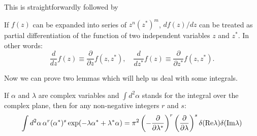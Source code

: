 This is straightforwardly followed by
\begin{lemma}
\label{lmm:formalism:c-numbers:independent-vars}
If $f(z)$ can be expanded into series of $z^n (z^*)^m$, $df(z)/dz$ can be treated as partial differentiation of the function of two independent variables $z$ and $z^*$.
In other words:
\[
	\frac{d}{dz} f(z) \equiv \frac{\partial}{\partial z} f(z, z^*),
	\quad
	\frac{d}{dz^*} f(z) \equiv \frac{\partial}{\partial z^*} f(z, z^*).
\]
\end{lemma}

Now we can prove two lemmas which will help us deal with some integrals.

\begin{lemma}
\label{lmm:formalism:c-numbers:fourier-of-moments}
If $\alpha$ and $\lambda$ are complex variables and $\int d^2\alpha$ stands for the integral over the complex plane, then for any non-negative integers $r$ and $s$:
\[
	\int d^2\alpha\, \alpha^r (\alpha^*)^s \exp(-\lambda \alpha^* + \lambda^* \alpha)
	= \pi^2
		\left( -\frac{\partial}{\partial \lambda^*} \right)^r
		\left( \frac{\partial}{\partial \lambda} \right)^s
		\delta(\mathrm{Re} \lambda) \delta(\mathrm{Im} \lambda)
\]
\end{lemma}

